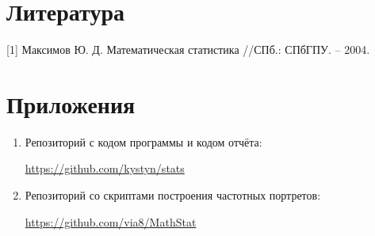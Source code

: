 \section{Литература}
[1] Максимов Ю. Д. Математическая статистика //СПб.: СПбГПУ. – 2004. \label{tyrsin}

\section{Приложения}

\begin{enumerate}
	\item Репозиторий с кодом программы и кодом отчёта:
	
	\href{https://github.com/kystyn/stats}{https://github.com/kystyn/stats}
	
	\item Репозиторий со скриптами построения частотных портретов:
	
	\href{https://github.com/via8/MathStat}{https://github.com/via8/MathStat}	
\end{enumerate}